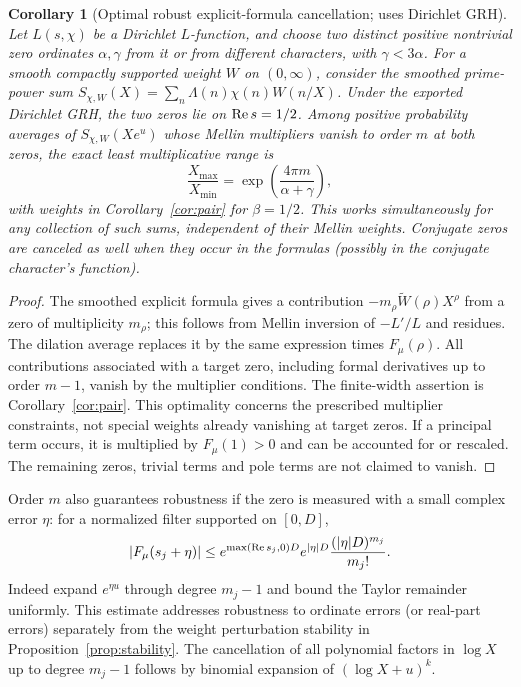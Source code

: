 \documentclass[11pt]{article}
\newtheorem{corollary}[theorem]{Corollary}
\theoremstyle{remark}\newtheorem{remark}[theorem]{Remark}
\begin{document}
\begin{corollary}[Optimal robust explicit-formula cancellation; uses Dirichlet GRH]\label{cor:prime}
Let $L(s,\chi)$ be a Dirichlet $L$-function, and choose two distinct positive nontrivial zero ordinates $\alpha,\gamma$ from it or from different characters, with $\gamma<3\alpha$. For a smooth compactly supported weight $W$ on $(0,\infty)$, consider the smoothed prime-power sum $S_{\chi,W}(X)=\sum_n\Lambda(n)\chi(n)W(n/X)$. Under the exported Dirichlet GRH, the two zeros lie on $\operatorname{Re} s=1/2$. Among positive probability averages of $S_{\chi,W}(Xe^u)$ whose Mellin multipliers vanish to order $m$ at both zeros, the exact least multiplicative range is
\[
 \frac{X_{\max}}{X_{\min}}=\exp\left(\frac{4\pi m}{\alpha+\gamma}\right),
\]
with weights in Corollary~\ref{cor:pair} for $\beta=1/2$. This works simultaneously for any collection of such sums, independent of their Mellin weights. Conjugate zeros are canceled as well when they occur in the formulas (possibly in the conjugate character's function).
\end{corollary}
\begin{proof}
The smoothed explicit formula gives a contribution $-m_\rho \widetilde W(\rho)X^\rho$ from a zero of multiplicity $m_\rho$; this follows from Mellin inversion of $-L'/L$ and residues. The dilation average replaces it by the same expression times $F_\mu(\rho)$. All contributions associated with a target zero, including formal derivatives up to order $m-1$, vanish by the multiplier conditions. The finite-width assertion is Corollary~\ref{cor:pair}. This optimality concerns the prescribed multiplier constraints, not special weights already vanishing at target zeros. If a principal term occurs, it is multiplied by $F_\mu(1)>0$ and can be accounted for or rescaled. The remaining zeros, trivial terms and pole terms are not claimed to vanish.
\end{proof}

Order $m$ also guarantees robustness if the zero is measured with a small complex error $\eta$: for a normalized filter supported on $[0,D]$,
\begin{equation}\label{eq:robust}
 |F_\mu(s_j+\eta)|\le e^{\max(\operatorname{Re} s_j,0)D}e^{|\eta|D}\frac{(|\eta|D)^{m_j}}{m_j!}.
\end{equation}
Indeed expand $e^{\eta u}$ through degree $m_j-1$ and bound the Taylor remainder uniformly. This estimate addresses robustness to ordinate errors (or real-part errors) separately from the weight perturbation stability in Proposition~\ref{prop:stability}. The cancellation of all polynomial factors in $\log X$ up to degree $m_j-1$ follows by binomial expansion of $(\log X+u)^k$.
\end{document}
